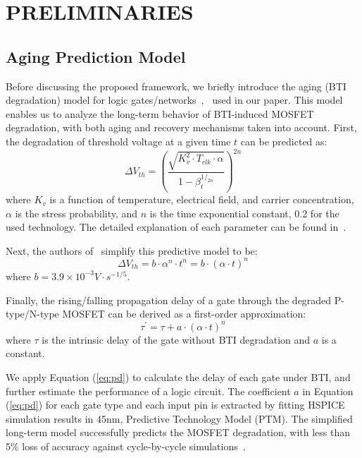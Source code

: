 \section{PRELIMINARIES}
\label{sec:preliminary}

\subsection{Aging Prediction Model}
\label{subsec:apm}
Before discussing the proposed framework, we briefly introduce the aging (BTI degradation) model for logic gates/networks~\cite{wang2010impact},~\cite{wang2007efficient} used in our paper. This model enables us to analyze the long-term behavior of BTI-induced MOSFET degradation, with both aging and recovery mechanisms taken into account. First, the degradation of threshold voltage at a given time $t$ can be predicted as:
\begin{equation}
\label{eq:dtv}
\Delta V_{th}=\left(\frac{\sqrt{K_v^2 \cdot T_{clk} \cdot \alpha}}{1-\beta_t^{1/_{2n}}}\right)^{2n}
\end{equation}
where $K_v$ is a function of temperature, electrical field, and carrier concentration, $\alpha$ is the stress probability, and $n$ is the time exponential constant, 0.2 for the used technology. The detailed explanation of each parameter can be found in~\cite{wang2010impact}.

Next, the authors of~\cite{wang2007efficient} simplify this predictive model to be:
\begin{equation}
\label{eq:dtv2}
\Delta V_{th}=b\cdot  \alpha^n \cdot t^n = b \cdot \left(\alpha \cdot t \right)^n
\end{equation}
where $b = 3.9 \times 10^{-3} V \cdot s^{-1/5}$.

Finally, the rising/falling propagation delay of a gate through the degraded P-type/N-type MOSFET can be derived as a first-order approximation:
\begin{equation}
\label{eq:pd}
\tau^\prime = \tau + a \cdot \left(\alpha \cdot  t\right)^n
\end{equation}
where $\tau$ is the intrinsic delay of the gate without BTI degradation and $a$ is a constant.

We apply Equation (\ref{eq:pd}) to calculate the delay of each gate under BTI, and further estimate the performance of a logic circuit. The coefficient $a$ in Equation (\ref{eq:pd}) for each gate type and each input pin is extracted by fitting HSPICE simulation results in 45nm, Predictive Technology Model (PTM). The simplified long-term model successfully predicts the MOSFET degradation, with less than 5\% loss of accuracy against cycle-by-cycle simulations~\cite{wang2010impact}.

